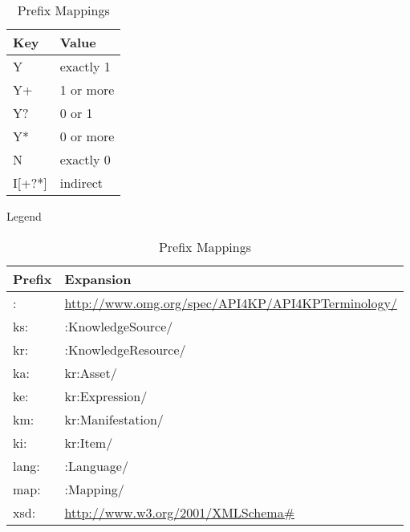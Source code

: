 \documentclass[runningheads]{llncs}
\begin{document}
\begin{table}[h]
\begin{minipage}[b]{0.20\linewidth}
\centering
\begin{tabular}{|l|l|}
\hline
\textbf{Key} & \textbf{Value} \\ \hline
Y            & exactly 1      \\ \hline
Y+           & 1 or more      \\ \hline
Y?           & 0 or 1         \\ \hline
Y*           & 0 or more      \\ \hline
N            & exactly 0      \\ \hline
I[+?*]       & indirect      \\ \hline
\end{tabular}
\caption{Legend}
\label{legend}
\end{minipage}
\hspace{0.5cm}
\begin{minipage}[b]{0.70\linewidth}
\centering
\begin{tabular}{|l|l|}
\hline
\textbf{Prefix} & \textbf{Expansion} \\ \hline
:            & \url{http://www.omg.org/spec/API4KP/API4KPTerminology/}      \\ \hline
ks:            & :KnowledgeSource/      \\ \hline
kr:            & :KnowledgeResource/      \\ \hline
ka:            & kr:Asset/      \\ \hline
ke:            & kr:Expression/      \\ \hline
km:            & kr:Manifestation/      \\ \hline
ki:            & kr:Item/      \\ \hline
lang:            & :Language/      \\ \hline
map:            & :Mapping/      \\ \hline
xsd:            & \url{http://www.w3.org/2001/XMLSchema#}     \\ \hline
\end{tabular}
\caption{Prefix Mappings}
\label{abbreviations}
\end{minipage}
\end{table}
 
\end{document}
